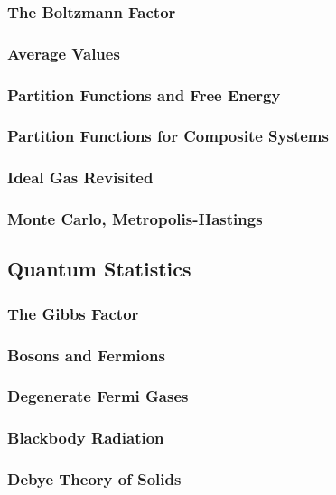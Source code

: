 \documentclass[a4paper]{article}
\begin{document}
\subsubsection{The Boltzmann Factor}
\subsubsection{Average Values}
\subsubsection{Partition Functions and Free Energy}
\subsubsection{Partition Functions for Composite Systems}
\subsubsection{Ideal Gas Revisited}
\subsubsection{Monte Carlo, Metropolis-Hastings}

\subsection{Quantum Statistics}
\subsubsection{The Gibbs Factor}
\subsubsection{Bosons and Fermions}
\subsubsection{Degenerate Fermi Gases}
\subsubsection{Blackbody Radiation}
\subsubsection{Debye Theory of Solids}
\end{document}
